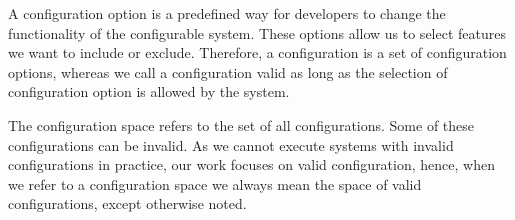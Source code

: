 A configuration option is a predefined way for developers to change the functionality of the configurable system.
These options allow us to select features we want to include or exclude. Therefore, a configuration is a set of configuration options, whereas 
we call a configuration valid as long as the selection of configuration option is allowed by the system.

The configuration space refers to the set of all configurations. Some of these configurations can be invalid. 
As we cannot execute systems with invalid configurations in practice, our work focuses on valid configuration,
hence, when we refer to a configuration space we always mean the space of valid configurations, except otherwise noted.

